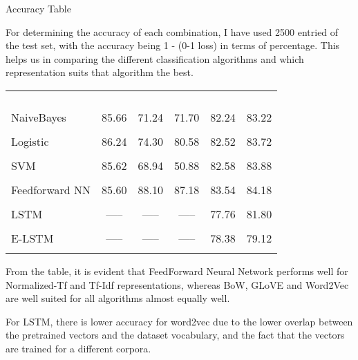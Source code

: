 \documentclass{article}
\begin{document}
\begin{qsection}{Accuracy Table}

	For determining the accuracy of each combination, I have used  2500  entried  of
	the test set, with the accuracy being 1 - (0-1 loss)  in  terms  of  percentage.
	This helps us in comparing the different  classification  algorithms  and  which
	representation suits that algorithm the best.


	\begin{tabular}{| l | c | c | c | c | c |}
		\hline
		&		 &				&		&		   		&	    						\\
		\bt{Model - Representation} 	& \bt{BoW}	& \bt{Normalized-TF} &	\bt{Tf-Idf} &  \bt{Word2Vec} & \bt{GLoVE}  \\
		&		 &				&		&		   		&	    						\\
		\hline
		&		 &				&		&		   		&	    						\\
		NaiveBayes			 	& 85.66	& 71.24			&	71.70  &   82.24   & 83.22  \\
		&		 &				&		&				&	    						\\
		Logistic				& 86.24 & 74.30			&	80.58  &   82.52   & 83.72  \\
		&		 &				&		&		   		&	    						\\
		SVM					 	& 85.62 & 68.94			&	50.88  &   82.58   & 83.88  \\
		&		 &				&		&		   		&	    						\\
		Feedforward NN		 	& 85.60 & 88.10			&	87.18  &   83.54   & 84.18  \\
		&		 &				&		&				&	    						\\
		LSTM					& ----- & -----	 		&	-----  &   77.76   & 81.80  \\
		&		 &				&		&		   		&	    						\\
		E-LSTM				 	& ----- & -----	 		&	-----  &   78.38   & 79.12  \\
		&		 &				&		&		   		&	    						\\
		\hline
	\end{tabular}

	From the table, it is evident that FeedForward Neural Network performs well  for Normalized-Tf and Tf-Idf representations, whereas BoW, GLoVE  and  Word2Vec  are well suited for all algorithms almost equally well.

	For LSTM, there is lower accuracy for word2vec due to the lower overlap  between the pretrained vectors and the dataset vocabulary, and the fact that the vectors are trained for a different corpora.

\end{qsection}
\end{document}
